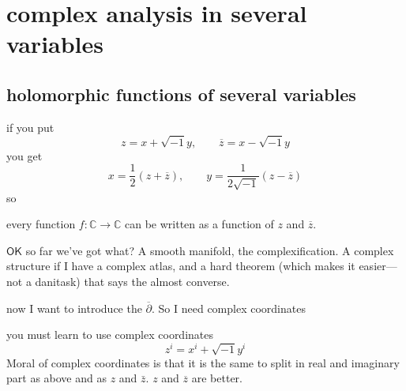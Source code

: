 \section{complex analysis in several variables}

\subsection{holomorphic functions of several variables}


if you put
\[z=x+\sqrt{-1}y,\qquad \overline{z}=x-\sqrt{-1}y\]
you get
\[x=\frac{1}{2}(z+\overline{z}),\qquad y=\frac{1}{2\sqrt{-1}}(z-\overline{z})\]
so
\begin{tcolorbox}[colback=white,colframe=black,boxrule=0.5pt,sharp corners]
every function \(f:\mathbb{C}\to \mathbb{C}\) can be written as a function of \(z\) and \(\overline{z}\).
\end{tcolorbox}
\(\mathsf{OK}\) so far we've got what? A smooth manifold, the complexification. A complex structure if I have a complex atlas, and a hard theorem (which makes it easier---not a danitask) that says the almost converse.

now I want to introduce the \(\overline{\partial}\). So I need complex coordinates

you must learn to use complex coordinates
\[z^i=x^i+\sqrt{-1}y^i \]
Moral of complex coordinates is that it is the same to split in real and imaginary part as above and as \(z\) and \(\bar{z} \). \(z\) and \(\overline{z}\) are better.

